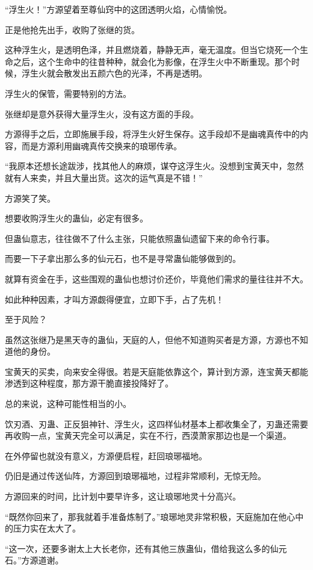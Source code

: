\begin{this_body}
“浮生火！”方源望着至尊仙窍中的这团透明火焰，心情愉悦。

正是他抢先出手，收购了张继的货。

这种浮生火，是透明色泽，并且燃烧着，静静无声，毫无温度。但当它烧死一个生命之后，这个生命中的往昔种种，就会化为影像，在浮生火中不断重现。那个时候，浮生火就会散发出五颜六色的光泽，不再是透明。

浮生火的保管，需要特别的方法。

张继却是意外获得大量浮生火，没有这方面的手段。

方源得手之后，立即施展手段，将浮生火好生保存。这手段却不是幽魂真传中的内容，而是方源利用幽魂真传交换来的琅琊传承。

“我原本还想长途跋涉，找其他人的麻烦，谋夺这浮生火。没想到宝黄天中，忽然就有人来卖，并且大量出货。这次的运气真是不错！”

方源笑了笑。

想要收购浮生火的蛊仙，必定有很多。

但蛊仙意志，往往做不了什么主张，只能依照蛊仙遗留下来的命令行事。

而要一下子拿出那么多的仙元石，也不是寻常蛊仙能够做到的。

就算有资金在手，这些围观的蛊仙也想讨价还价，毕竟他们需求的量往往并不大。

如此种种因素，才叫方源觑得便宜，立即下手，占了先机！

至于风险？

虽然这张继乃是黑天寺的蛊仙，天庭的人，但他不知道购买者是方源，方源也不知道他的身份。

宝黄天的买卖，向来安全得很。若是天庭能依靠这个，算计到方源，连宝黄天都能渗透到这种程度，那方源干脆直接投降好了。

总的来说，这种可能性相当的小。

饮刃酒、刃蛊、正反狙神针、浮生火，这四样仙材基本上都收集全了，刃蛊还需要再收购一点，宝黄天完全可以满足，实在不行，西漠萧家那边也是一个渠道。

在外停留也就没有意义，方源便启程，赶回琅琊福地。

仍旧是通过传送仙阵，方源回到琅琊福地，过程非常顺利，无惊无险。

方源回来的时间，比计划中要早许多，这让琅琊地灵十分高兴。

“既然你回来了，那我就着手准备炼制了。”琅琊地灵非常积极，天庭施加在他心中的压力实在太大了。

“这一次，还要多谢太上大长老你，还有其他三族蛊仙，借给我这么多的仙元石。”方源道谢。


\end{this_body}
